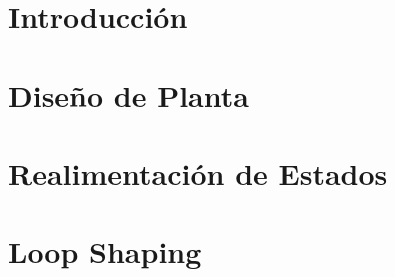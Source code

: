 




\setmainfont{AvenirLTStd-Roman}




\setmainfont{Calibri}
 

\MyIndex

\hypersetup{linkcolor=AzulInfo}

\newpage




\section{Introducción}


\section{Diseño de Planta}


\section{Realimentación de Estados}


\section{Loop Shaping}


%


